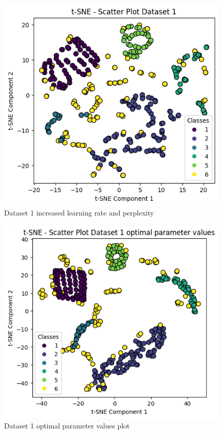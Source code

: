 \documentclass[12pt]{report}
\begin{document}
	\begin{figure}[H]
		\centering
		\includegraphics[scale=0.7]{../t-SNE/OutputPlot/Dataset1OutputPlot/Dataset1 increased learning and perplexity.png}
		\caption{Dataset 1 increased learning rate and perplexity}
		\label{dataset1IncreasedLearningANDPerplexity}
	\end{figure}
	\begin{figure}[H]
		\centering
		\includegraphics[scale=0.7]{../t-SNE/OutputPlot/Dataset1OutputPlot/dataset1 optimal parameter values.png}
		\caption{Dataset 1 optimal parameter values plot}
		\label{dataset1OptimalparameterValuesPlot}
	\end{figure}
\end{document}
